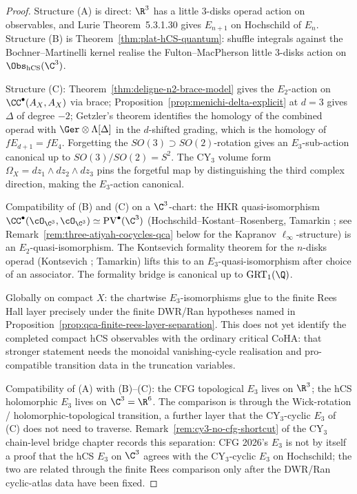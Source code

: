 \begin{proof}
Structure \textup{(A)} is direct: $\R^3$ has a little $3$-disks operad action on observables, and Lurie \cite{LurieHA} Theorem~5.3.1.30 gives $E_{n+1}$ on Hochschild of $E_n$. Structure \textup{(B)} is Theorem~\ref{thm:plat-hCS-quantum}: shuffle integrals against the Bochner--Martinelli kernel realise the Fulton--MacPherson little $3$-disks action on $\Obs_{\hCS}(\C^3)$.

Structure \textup{(C)}: Theorem~\ref{thm:deligne-n2-brace-model} gives the $E_2$-action on $\CC^\bullet(A_X, A_X)$ via brace; Proposition~\ref{prop:menichi-delta-explicit} at $d = 3$ gives $\Delta$ of degree $-2$; Getzler's theorem identifies the homology of the combined operad with $\Ger \otimes \Lambda[\Delta]$ in the $d$-shifted grading, which is the homology of $fE_{d+1} = fE_4$. Forgetting the $SO(3) \supset SO(2)$-rotation gives an $E_3$-sub-action canonical up to $SO(3)/SO(2) = S^2$. The CY$_3$ volume form $\Omega_X = dz_1 \wedge dz_2 \wedge dz_3$ pins the forgetful map by distinguishing the third complex direction, making the $E_3$-action canonical.

Compatibility of \textup{(B)} and \textup{(C)} on a $\C^3$-chart: the HKR quasi-isomorphism $\CC^\bullet(\cO_{\C^3}, \cO_{\C^3}) \simeq \mathrm{PV}^\bullet(\C^3)$ (Hochschild--Kostant--Rosenberg, Tamarkin \cite{TamarkinAnotherProof}; see Remark~\ref{rem:three-atiyah-cocycles-qca} below for the Kapranov $\ell_\infty$-structure) is an $E_2$-quasi-isomorphism. The Kontsevich formality theorem for the $n$-disks operad (Kontsevich \cite{KontsevichOperads}; Tamarkin) lifts this to an $E_3$-quasi-isomorphism after choice of an associator. The formality bridge is canonical up to $\mathrm{GRT}_1(\Q)$.

Globally on compact $X$: the chartwise $E_3$-isomorphisms glue to the finite Rees Hall layer precisely under the finite DWR/Ran hypotheses named in Proposition~\ref{prop:qca-finite-rees-layer-separation}.  This does not yet identify the completed compact hCS observables with the ordinary critical CoHA: that stronger statement needs the monoidal vanishing-cycle realisation and pro-compatible transition data in the truncation variables.

Compatibility of \textup{(A)} with \textup{(B)}--\textup{(C)}: the CFG topological $E_3$ lives on $\R^3$; the hCS holomorphic $E_3$ lives on $\C^3 = \R^6$. The comparison is through the Wick-rotation / holomorphic-topological transition, a further layer that the CY$_3$-cyclic $E_3$ of \textup{(C)} does not need to traverse. Remark~\ref{rem:cy3-no-cfg-shortcut} of the CY$_3$ chain-level bridge chapter records this separation: CFG 2026's $E_3$ is not by itself a proof that the hCS $E_3$ on $\C^3$ agrees with the CY$_3$-cyclic $E_3$ on Hochschild; the two are related through the finite Rees comparison only after the DWR/Ran cyclic-atlas data have been fixed.
\end{proof}

